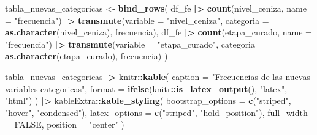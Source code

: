 \documentclass[
]{book}
\newenvironment{Shaded}{\begin{snugshade}}{\end{snugshade}}
\newcommand{\AttributeTok}[1]{\textcolor[rgb]{0.13,0.29,0.53}{#1}}
\newcommand{\ConstantTok}[1]{\textcolor[rgb]{0.56,0.35,0.01}{#1}}
\newcommand{\FunctionTok}[1]{\textcolor[rgb]{0.13,0.29,0.53}{\textbf{#1}}}
\newcommand{\NormalTok}[1]{#1}
\newcommand{\OtherTok}[1]{\textcolor[rgb]{0.56,0.35,0.01}{#1}}
\newcommand{\SpecialCharTok}[1]{\textcolor[rgb]{0.81,0.36,0.00}{\textbf{#1}}}
\newcommand{\StringTok}[1]{\textcolor[rgb]{0.31,0.60,0.02}{#1}}
\begin{document}
\begin{Shaded}
\begin{Highlighting}[]
\NormalTok{tabla\_nuevas\_categoricas }\OtherTok{\textless{}{-}} \FunctionTok{bind\_rows}\NormalTok{(}
\NormalTok{  df\_fe }\SpecialCharTok{|\textgreater{}}
    \FunctionTok{count}\NormalTok{(nivel\_ceniza, }\AttributeTok{name =} \StringTok{"frecuencia"}\NormalTok{) }\SpecialCharTok{|\textgreater{}}
    \FunctionTok{transmute}\NormalTok{(}\AttributeTok{variable =} \StringTok{"nivel\_ceniza"}\NormalTok{, }\AttributeTok{categoria =} \FunctionTok{as.character}\NormalTok{(nivel\_ceniza), frecuencia),}
\NormalTok{  df\_fe }\SpecialCharTok{|\textgreater{}}
    \FunctionTok{count}\NormalTok{(etapa\_curado, }\AttributeTok{name =} \StringTok{"frecuencia"}\NormalTok{) }\SpecialCharTok{|\textgreater{}}
    \FunctionTok{transmute}\NormalTok{(}\AttributeTok{variable =} \StringTok{"etapa\_curado"}\NormalTok{, }\AttributeTok{categoria =} \FunctionTok{as.character}\NormalTok{(etapa\_curado), frecuencia)}
\NormalTok{)}

\NormalTok{tabla\_nuevas\_categoricas }\SpecialCharTok{|\textgreater{}}
\NormalTok{  knitr}\SpecialCharTok{::}\FunctionTok{kable}\NormalTok{(}
    \AttributeTok{caption =} \StringTok{"Frecuencias de las nuevas variables categoricas"}\NormalTok{,}
    \AttributeTok{format =} \FunctionTok{ifelse}\NormalTok{(knitr}\SpecialCharTok{::}\FunctionTok{is\_latex\_output}\NormalTok{(), }\StringTok{"latex"}\NormalTok{, }\StringTok{"html"}\NormalTok{)}
\NormalTok{  ) }\SpecialCharTok{|\textgreater{}}
\NormalTok{  kableExtra}\SpecialCharTok{::}\FunctionTok{kable\_styling}\NormalTok{(}
    \AttributeTok{bootstrap\_options =} \FunctionTok{c}\NormalTok{(}\StringTok{"striped"}\NormalTok{, }\StringTok{"hover"}\NormalTok{, }\StringTok{"condensed"}\NormalTok{),}
    \AttributeTok{latex\_options =} \FunctionTok{c}\NormalTok{(}\StringTok{"striped"}\NormalTok{, }\StringTok{"hold\_position"}\NormalTok{),}
    \AttributeTok{full\_width =} \ConstantTok{FALSE}\NormalTok{,}
    \AttributeTok{position =} \StringTok{"center"}
\NormalTok{  )}
\end{Highlighting}
\end{Shaded}
\end{document}
